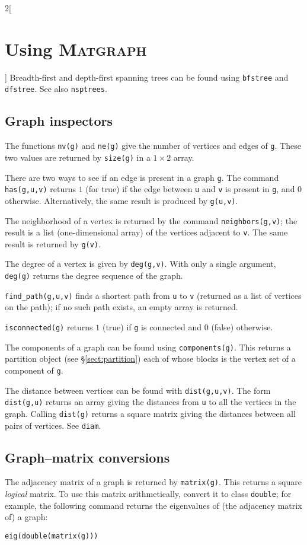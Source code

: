 \documentclass{amsart}
\newcommand\matgraph{\textsc{Matgraph}}
\begin{document}
\begin{multicols}{2}[\section{Using \matgraph}]
Breadth-first and depth-first spanning trees can be found using
\verb|bfstree| and \verb|dfstree|. See also \verb|nsptrees|. 

\subsection{Graph inspectors}
\label{subsect:inspectors}

The functions \verb|nv(g)| and \verb|ne(g)| give the number of
vertices and edges of \verb|g|. These two values are returned by
\verb|size(g)| in a $1\times2$ array. 

There are two ways to see if an edge is present in a graph \verb|g|.
The command \verb|has(g,u,v)| returns $1$ (for true) if the edge
between \verb|u| and \verb|v| is present in \verb|g|, and $0$
otherwise. Alternatively, the same result is produced by
\verb|g(u,v)|.

The neighborhood of a vertex is returned by the command
\verb|neighbors(g,v)|; the result is a list (one-dimensional array) of
the vertices adjacent to \verb|v|. The same result is returned by
\verb|g(v)|. 

The degree of a vertex is given by \verb|deg(g,v)|. With only a single
argument, \verb|deg(g)| returns the degree sequence of the graph.

\verb|find_path(g,u,v)| finds a shortest path from \verb|u| to
\verb|v| (returned as a list of vertices on the path); if no such path
exists, an empty array is returned. 

\verb|isconnected(g)| returns $1$ (true) if \verb|g| is connected and
$0$ (false) otherwise. 

The components of a graph can be found using
\verb|components(g)|. This returns a partition object (see
\S\ref{sect:partition}) each of whose blocks is the vertex set of a
component of \verb|g|.

The distance between vertices can be found with
\verb|dist(g,u,v)|. The form \verb|dist(g,u)| returns an array giving
the distances from \verb|u| to all the vertices in the graph. Calling
\verb|dist(g)| returns a square matrix giving the distances between
all pairs of vertices. See \verb|diam|.



\subsection{Graph--matrix conversions}
\label{subsect:graph-matrix}

The adjacency matrix of a graph is returned by \verb|matrix(g)|. This
returns a square \emph{logical} matrix. To use this matrix
arithmetically, convert it to class \verb|double|; for example, the
following command returns the eigenvalues of (the adjacency matrix
of) a graph:
\begin{verbatim}
eig(double(matrix(g)))
\end{verbatim}


\end{multicols}
\end{document}

